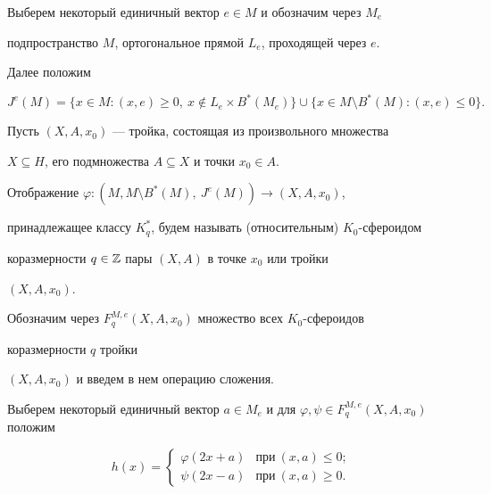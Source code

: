 Выберем некоторый единичный вектор $e\in M$ и обозначим через $M_e$ 


подпространство $M$, ортогональное прямой $L_e$, проходящей через $e$. 


Далее положим 


\begin{equation} 


J^e(M)=\{x\in M: (x,e)\ge0,\ x\notin L_e\times B^*(M_e)\}\cup 


\{x\in M\setminus B^*(M): (x,e)\le0\}. 


\end{equation} 


 


Пусть $(X,A,x_0)$ --- тройка, состоящая из произвольного множества 


$X\subseteq H$, его подмножества $A\subseteq X$ и точки $x_0\in A$. 


 


\begin{defn} 


Отображение $\varphi:(M,M\setminus B^*(M),\ J^e(M))\to(X,A,x_0)$,


принадлежащее классу $K^*_q$, будем называть (относительным) $K_0$-сфероидом 


коразмерности $q\in\Bbb Z$ пары $(X,A)$ в точке $x_0$ или тройки 


$(X,A,x_0)$. 


\end{defn} 


 


Обозначим через $F^{M,e}_q(X,A,x_0)$ множество всех $K_0$-сфероидов 


коразмерности $q$ тройки\linebreak


$(X,A,x_0)$ и введем в нем операцию сложения. 


Выберем некоторый единичный вектор $a\in M_e$ и для $\varphi,\psi \in


F^{M,e}_q(X,A,x_0)$ положим 


\begin{equation} 


h(x)= 


\begin{cases} 


\varphi(2x+a) &\text{при}\ (x,a)\le0; \\ 


\psi(2x-a) &\text{при}\ (x,a)\ge0. 


\end{cases} 


\end{equation} 


